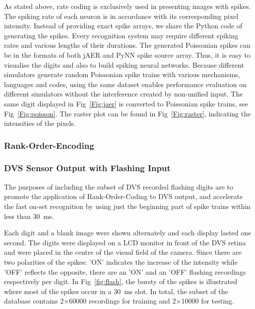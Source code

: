 	As stated above, rate coding is exclusively used in presenting images with spikes.
	The spiking rate of each neuron is in accordance with its corresponding pixel intensity.
	Instead of providing exact spike arrays, we share the Python code of generating the spikes.
	Every recognition system may require different spiking rates and various lengths of their durations.
	The generated Poissonian spikes can be in the formats of both jAER and PyNN spike source array.
	Thus, it is easy to visualise the digits and also to build spiking neural networks.
	Because different simulators generate random Poissonian spike trains with various mechanisms, languages and codes, using the same dataset enables performance evaluation on different simulators without the interference created by non-unified input.
	The same digit displayed in Fig~\ref{Fig:jaer} is converted to Poissonian spike trains, see Fig~\ref{Fig:poisson}.
	The raster plot can be found in Fig~\ref{Fig:raster}, indicating the intensities of the pixels.


	
	\subsubsection{Rank-Order-Encoding}
  
	\subsubsection{DVS Sensor Output with Flashing Input}
	\label{subsec_flash}
	The purposes of including the subset of DVS recorded flashing digits are to promote the application of Rank-Order-Coding to DVS output, and accelerate the fast on-set recognition by using just the beginning part of spike trains within less than 30~ms.
	
	Each digit and a blank image were shown alternately and each display lasted one second.
	The digits were displayed on a LCD monitor in front of the DVS retina~\citep{serrano2013128} and were placed in the centre of the visual field of the camera.
	Since there are two polarities of the spikes: 'ON' indicates the increase of the intensity while 'OFF' reflects the opposite, there are an 'ON' and an 'OFF' flashing recordings respectively per digit.
	In Fig~\ref{fig:flash}, the bursty of the spikes is illustrated where most of the spikes occur in a 30~ms slot. 
	In total, the subset of the database contains 2$\times$60000 recordings for training and 2$\times$10000 for testing.

